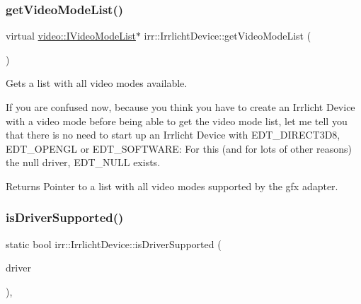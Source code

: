 \subsubsection{\texorpdfstring{get\+Video\+Mode\+List()}{getVideoModeList()}\hspace{0.1cm}{\footnotesize\ttfamily [2/2]}}
{\footnotesize\ttfamily virtual \hyperlink{classirr_1_1video_1_1IVideoModeList}{video\+::\+I\+Video\+Mode\+List}$\ast$ irr\+::\+Irrlicht\+Device\+::get\+Video\+Mode\+List (\begin{DoxyParamCaption}{ }\end{DoxyParamCaption})\hspace{0.3cm}{\ttfamily [pure virtual]}}



Gets a list with all video modes available. 

If you are confused now, because you think you have to create an Irrlicht Device with a video mode before being able to get the video mode list, let me tell you that there is no need to start up an Irrlicht Device with E\+D\+T\+\_\+\+D\+I\+R\+E\+C\+T3\+D8, E\+D\+T\+\_\+\+O\+P\+E\+N\+GL or E\+D\+T\+\_\+\+S\+O\+F\+T\+W\+A\+RE\+: For this (and for lots of other reasons) the null driver, E\+D\+T\+\_\+\+N\+U\+LL exists. \begin{DoxyReturn}{Returns}
Pointer to a list with all video modes supported by the gfx adapter. 
\end{DoxyReturn}
\mbox{\label{classirr_1_1IrrlichtDevice_a5a74995aec731b26c6a9cb5bea6842fe}} 
\subsubsection{\texorpdfstring{is\+Driver\+Supported()}{isDriverSupported()}\hspace{0.1cm}{\footnotesize\ttfamily [1/2]}}
{\footnotesize\ttfamily static bool irr\+::\+Irrlicht\+Device\+::is\+Driver\+Supported (\begin{DoxyParamCaption}\item[{\hyperlink{namespaceirr_1_1video_ae35a6de6d436c76107ad157fe42356d0}{video\+::\+E\+\_\+\+D\+R\+I\+V\+E\+R\+\_\+\+T\+Y\+PE}}]{driver }\end{DoxyParamCaption})\hspace{0.3cm}{\ttfamily [inline]}, {\ttfamily [static]}}



